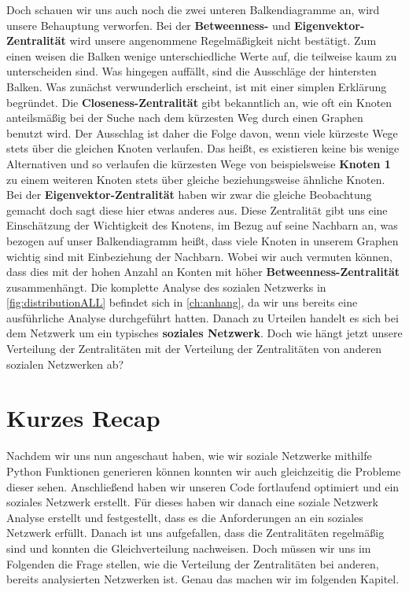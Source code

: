 Doch schauen wir uns auch noch die zwei unteren Balkendiagramme an, wird unsere Behauptung verworfen. Bei der \textbf{Betweenness-} und \textbf{Eigenvektor-Zentralität} wird unsere angenommene Regelmäßigkeit nicht bestätigt. Zum einen weisen die Balken wenige unterschiedliche Werte auf, die teilweise kaum zu unterscheiden sind. Was hingegen auffällt, sind die Ausschläge der hintersten Balken. Was zunächst verwunderlich erscheint, ist mit einer simplen Erklärung begründet. Die \textbf{Closeness-Zentralität} gibt bekanntlich an, wie oft ein Knoten anteilsmäßig bei der Suche nach dem kürzesten Weg durch einen Graphen benutzt wird. Der Ausschlag ist daher die Folge davon, wenn viele kürzeste Wege stets über die gleichen Knoten verlaufen. Das heißt, es existieren keine bis wenige Alternativen und so verlaufen die kürzesten Wege von beispielsweise \textbf{Knoten 1} zu einem weiteren Knoten stets über gleiche beziehungsweise ähnliche Knoten. Bei der \textbf{Eigenvektor-Zentralität} haben wir zwar die gleiche Beobachtung gemacht doch sagt diese hier etwas anderes aus. Diese Zentralität gibt uns eine Einschätzung der Wichtigkeit des Knotens, im Bezug auf seine Nachbarn an, was bezogen auf unser Balkendiagramm heißt, dass viele Knoten in unserem Graphen wichtig sind mit Einbeziehung der Nachbarn. Wobei wir auch vermuten können, dass dies mit der hohen Anzahl an Konten mit höher \textbf{Betweenness-Zentralität} zusammenhängt. 
Die komplette Analyse des sozialen Netzwerks in \ref{fig:distributionALL} befindet sich in \ref{ch:anhang}, da wir uns bereits eine ausführliche Analyse durchgeführt hatten. Danach zu Urteilen handelt es sich bei dem Netzwerk um ein typisches \textbf{soziales Netzwerk}. Doch wie hängt jetzt unsere Verteilung der Zentralitäten mit der Verteilung der Zentralitäten von anderen sozialen Netzwerken ab? 

\section{Kurzes Recap}
Nachdem wir uns nun angeschaut haben, wie wir soziale Netzwerke mithilfe Python Funktionen generieren können konnten wir auch gleichzeitig die Probleme dieser sehen. Anschließend haben wir unseren Code fortlaufend optimiert und ein soziales Netzwerk erstellt. Für dieses haben wir danach eine soziale Netzwerk Analyse erstellt und festgestellt, dass es die Anforderungen an ein soziales Netzwerk erfüllt. Danach ist uns aufgefallen, dass die Zentralitäten regelmäßig sind und konnten die Gleichverteilung nachweisen. Doch müssen wir uns im Folgenden die Frage stellen, wie die Verteilung der Zentralitäten bei anderen, bereits analysierten Netzwerken ist. Genau das machen wir im folgenden Kapitel.
